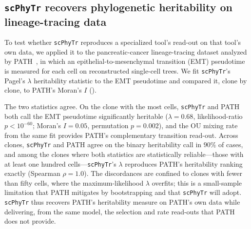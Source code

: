 \documentclass{article}
\newcommand{\scphytr}{\texttt{scPhyTr}}
\begin{document}
\subsection*{\scphytr{} recovers phylogenetic heritability on lineage-tracing data}

To test whether \scphytr{} reproduces a specialized tool's read-out on that tool's own
data, we applied it to the pancreatic-cancer lineage-tracing dataset analyzed by
PATH~\cite{schiffman_path_2024, simeonov_emt_2021}, in which an epithelial-to-mesenchymal
transition (EMT) pseudotime is measured for each cell on reconstructed single-cell trees.
We fit \scphytr{}'s Pagel's $\lambda$ heritability statistic to the EMT pseudotime and
compared it, clone by clone, to PATH's Moran's $I$ ().

The two statistics agree. On the clone with the most cells, \scphytr{} and PATH both call
the EMT pseudotime significantly heritable ($\lambda = 0.68$, likelihood-ratio
$p < 10^{-60}$; Moran's $I = 0.05$, permutation $p = 0.002$), and the OU mixing rate from
the same fit provides PATH's complementary transition read-out. Across clones, \scphytr{}
and PATH agree on the binary heritability call in $90\%$ of cases, and among the clones
where both statistics are statistically reliable---those with at least one hundred
cells---\scphytr{}'s $\lambda$ reproduces PATH's heritability ranking exactly (Spearman
$\rho = 1.0$). The discordances are confined to clones with fewer than fifty cells, where
the maximum-likelihood $\lambda$ overfits; this is a small-sample limitation that PATH
mitigates by bootstrapping and that \scphytr{} will adopt. \scphytr{} thus recovers PATH's
heritability measure on PATH's own data while delivering, from the same model, the
selection and rate read-outs that PATH does not provide.
\end{document}
